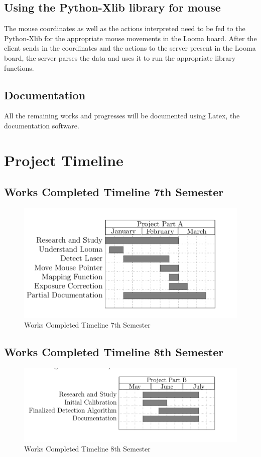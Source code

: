 \documentclass[12pt, a4paper]{article}
\begin{document}
\subsection{Using the Python-Xlib library for mouse}
	The mouse coordinates as well as the actions interpreted need to be fed to the Python-Xlib for the appropriate mouse movements in the Looma board. After the client sends in the coordinates and the actions to the server present in the Looma board, the server parses the data and uses it to run the appropriate library functions.

\subsection{Documentation}
	All the remaining works and progresses will be documented using Latex, the documentation software. 

\newpage
\section{Project Timeline}
\subsection{Works Completed Timeline 7th Semester}
\begin{figure}[htp]
\centering
\includegraphics[scale=0.35]{reformed1.png}
\caption{Works Completed Timeline 7th Semester}
\label{}
\end{figure}
\subsection{Works Completed Timeline 8th Semester}
\begin{figure}[htp]
\centering
\includegraphics[scale=0.35]{come8.png}
\caption{Works Completed Timeline 8th Semester}
\label{}
\end{figure}
\newpage
\end{document}
